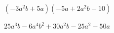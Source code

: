 
\question $(-3a^2b + 5a)(-5a + 2a^2b - 10)$

  \begin{solutionorlines}[2cm]
    $25a^3b - 6a^4b^2 + 30a^2b - 25a^2 - 50a$
  \end{solutionorlines}
